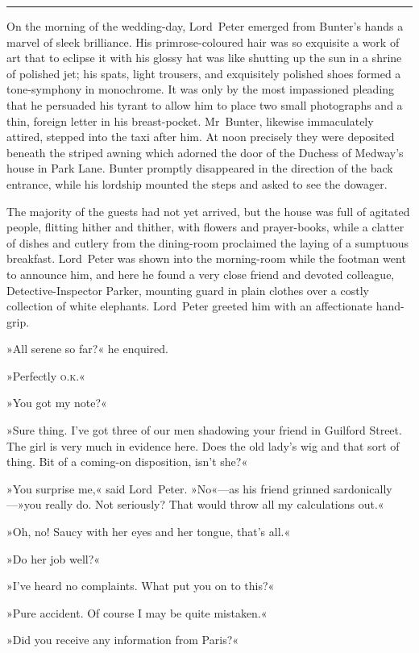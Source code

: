 \noindent\hfil\rule{0.5\textwidth}{.4pt}\hfil 

On the morning of the wedding-day, Lord~Peter emerged from Bunter's hands a marvel of sleek brilliance. His primrose-coloured hair was so exquisite a work of art that to eclipse it with his glossy hat was like shutting up the sun in a shrine of polished jet; his spats, light trousers, and exquisitely polished shoes formed a tone-symphony in monochrome. It was only by the most impassioned pleading that he persuaded his tyrant to allow him to place two small photographs and a thin, foreign letter in his breast-pocket. Mr~Bunter, likewise immaculately attired, stepped into the taxi after him. At noon precisely they were deposited beneath the striped awning which adorned the door of the Duchess of Medway's house in Park Lane. Bunter promptly disappeared in the direction of the back entrance, while his lordship mounted the steps and asked to see the dowager.

The majority of the guests had not yet arrived, but the house was full of agitated people, flitting hither and thither, with flowers and prayer-books, while a clatter of dishes and cutlery from the dining-room proclaimed the laying of a sumptuous breakfast. Lord~Peter was shown into the morning-room while the footman went to announce him, and here he found a very close friend and devoted colleague, Detective-Inspector Parker, mounting guard in plain clothes over a costly collection of white elephants. Lord~Peter greeted him with an affectionate hand-grip.

»All serene so far?« he enquired.

»Perfectly \textsc{o.k.}«

»You got my note?«

»Sure thing. I've got three of our men shadowing your friend in Guilford Street. The girl is very much in evidence here. Does the old lady's wig and that sort of thing. Bit of a coming-on disposition, isn't she?«

»You surprise me,« said Lord~Peter. »No«—as his friend grinned sardonically—»you really do. Not seriously? That would throw all my calculations out.«

»Oh, no! Saucy with her eyes and her tongue, that's all.«

»Do her job well?«

»I've heard no complaints. What put you on to this?«

»Pure accident. Of course I may be quite mistaken.«

»Did you receive any information from Paris?«

